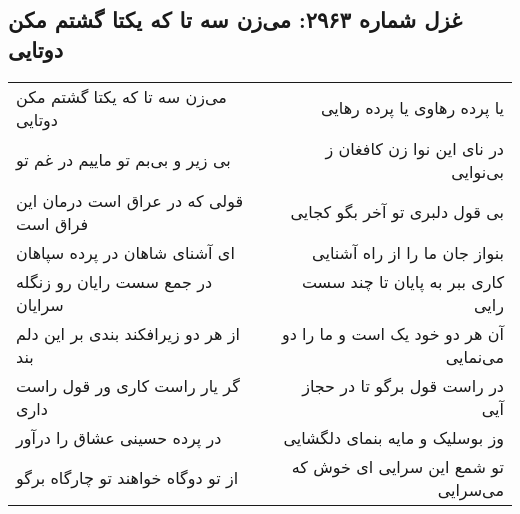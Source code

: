 \begin{center}
\section*{غزل شماره ۲۹۶۳: می‌زن سه تا که یکتا گشتم مکن دوتایی}
\label{sec:2963}
\begin{longtable}{l p{0.5cm} r}
می‌زن سه تا که یکتا گشتم مکن دوتایی
&&
یا پرده رهاوی یا پرده رهایی
\\
بی زیر و بی‌بم تو ماییم در غم تو
&&
در نای این نوا زن کافغان ز بی‌نوایی
\\
قولی که در عراق است درمان این فراق است
&&
بی قول دلبری تو آخر بگو کجایی
\\
ای آشنای شاهان در پرده سپاهان
&&
بنواز جان ما را از راه آشنایی
\\
در جمع سست رایان رو زنگله سرایان
&&
کاری ببر به پایان تا چند سست رایی
\\
از هر دو زیرافکند بندی بر این دلم بند
&&
آن هر دو خود یک است و ما را دو می‌نمایی
\\
گر یار راست کاری ور قول راست داری
&&
در راست قول برگو تا در حجاز آیی
\\
در پرده حسینی عشاق را درآور
&&
وز بوسلیک و مایه بنمای دلگشایی
\\
از تو دوگاه خواهند تو چارگاه برگو
&&
تو شمع این سرایی ای خوش که می‌سرایی
\\
\end{longtable}
\end{center}
